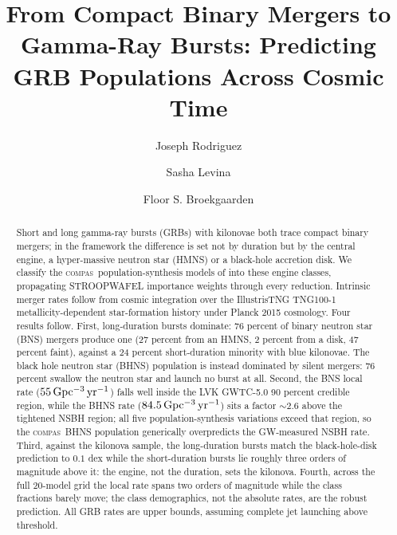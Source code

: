 \documentclass[twocolumn,amsmath]{aastex702}
\newcommand{\compas}{\textsc{compas}}
\newcommand{\Gpcyr}{{\rm Gpc^{-3}\,yr^{-1}}}
\begin{document}
\title{From Compact Binary Mergers to Gamma-Ray Bursts: Predicting GRB Populations Across Cosmic Time}

\author[orcid=0009-0000-4068-2032]{Joseph Rodriguez}

\author[orcid=0000-0003-1241-7615]{Sasha Levina}

\author[orcid=0000-0002-4421-4962]{Floor S. Broekgaarden}

\begin{abstract}
Short and long gamma-ray bursts (GRBs) with kilonovae both trace compact binary
mergers; in the \citet{gottlieb2023,gottlieb2024} framework the difference is
set not by duration but by the central engine, a hyper-massive neutron star
(HMNS) or a black-hole accretion disk. We classify the \compas\
population-synthesis models of \citet{broekgaarden2021} into these engine
classes, propagating STROOPWAFEL importance weights through every reduction.
Intrinsic merger rates follow from cosmic integration over the
\citet{levina2026} IllustrisTNG TNG100-1 metallicity-dependent star-formation
history under Planck 2015 cosmology. Four results follow. First,
long-duration bursts dominate: 76 percent of binary neutron star (BNS) mergers
produce one (27 percent from an HMNS, 2 percent from a disk, 47 percent
faint), against a 24 percent short-duration minority with blue kilonovae. The
black hole neutron star (BHNS) population is instead dominated by silent
mergers: 76 percent swallow the neutron star and launch no burst at all. Second, the BNS local rate ($55\,\Gpcyr$) falls well inside the LVK
GWTC-5.0 90 percent credible region, while the BHNS rate ($84.5\,\Gpcyr$) sits
a factor $\sim 2.6$ above the tightened NSBH region; all five
population-synthesis variations exceed that region, so the \compas\ BHNS
population generically overpredicts the GW-measured NSBH rate. Third, against the \citet{rastinejad2024} kilonova sample,
the long-duration bursts match the black-hole-disk prediction to $0.1$ dex
while the short-duration bursts lie roughly three orders of magnitude above
it: the engine, not the duration, sets the kilonova. Fourth, across the full
20-model grid the local rate spans two orders of magnitude while the class
fractions barely move; the class demographics, not the absolute rates, are the
robust prediction. All GRB rates are upper bounds, assuming complete jet
launching above threshold.
\end{abstract}
\end{document}
